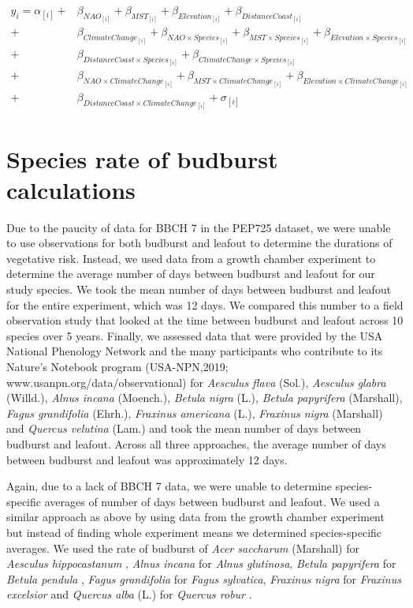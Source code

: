 \documentclass{article}\usepackage[]{graphicx}\usepackage[]{color}
\begin{document}
\begin{align*}
y_i = \alpha_{[i]} +&  \beta_{NAO_{[i]}} + \beta_{MST_{[i]}} + \beta_{Elevation_{[i]}} + \beta_{DistanceCoast_{[i]}} \\ +& \beta_{ClimateChange_{[i]}}
+ \beta_{NAO \times Species_{[i]}} + \beta_{MST \times Species_{[i]}} + \beta_{Elevation \times Species_{[i]}} \\ +& \beta_{DistanceCoast \times Species_{[i]}} + \beta_{ClimateChange \times Species_{[i]}} \\
+& \beta_{NAO \times ClimateChange_{[i]}} + \beta_{MST \times ClimateChange_{[i]}} 
+ \beta_{Elevation \times ClimateChange_{[i]}} \\ +& \beta_{DistanceCoast \times ClimateChange_{[i]}} + \sigma_{[i]} \tag{S1}
\end{align*}


\section*{Species rate of budburst calculations}
Due to the paucity of data for BBCH 7 in the PEP725 dataset, we were unable to use observations for both budburst and leafout to determine the durations of vegetative risk. Instead, we used data from a growth chamber experiment \citep{Flynn2018} to determine the average number of days between budburst and leafout for our study species. We took the mean number of days between budburst and leafout for the entire experiment, which was 12 days. We compared this number to a field observation study \citep{Donnelly2017} that looked at the time between budburst and leafout across 10 species over 5 years. Finally, we assessed data that were provided by the USA National Phenology Network and the many participants who contribute to its Nature's Notebook program (USA-NPN,2019; www.usanpn.org/data/observational) for \textit{Aesculus flava} (Sol.), \textit{Aesculus glabra} (Willd.), \textit{Alnus incana} (Moench.), \textit{Betula nigra} (L.), \textit{Betula papyrifera} (Marshall), \textit{Fagus grandifolia} (Ehrh.), \textit{Fraxinus americana} (L.), \textit{Fraxinus nigra} (Marshall) and \textit{Quercus velutina} (Lam.) and took the mean number of days between budburst and leafout. Across all three approaches, the average number of days between budburst and leafout was approximately 12 days.  

Again, due to a lack of BBCH 7 data, we were unable to determine species-specific averages of number of days between budburst and leafout. We used a similar approach as above by using data from the growth chamber experiment \citep{Flynn2018} but instead of finding whole experiment means we determined species-specific averages. We used the rate of budburst of \textit{Acer saccharum} (Marshall) for \textit{Aesculus hippocastanum} \citep{Buerki2010}, \textit{Alnus incana} for \textit{Alnus glutinosa}, \textit{Betula papyrifera} for \textit{Betula pendula} \citep{Wang2016}, \textit{Fagus grandifolia} for \textit{Fagus sylvatica}, \textit{Fraxinus nigra} for \textit{Fraxinus excelsior} and \textit{Quercus alba} (L.) for \textit{Quercus robur} \citep{Hipp2017}.
\end{document}
